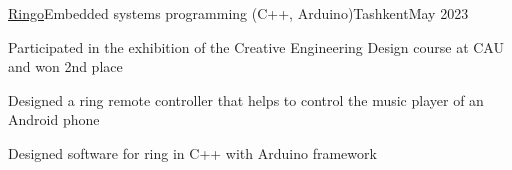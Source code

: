 \begin{resume_employer}{\href{https://drive.google.com/file/d/1yckMHFwHHNBtbgwnOTRsdhVB2KOukAbZ/view?usp=sharing}{Ringo}}{Embedded systems programming (C++, Arduino)}{Tashkent}{May 2023}
        \item Participated in the exhibition of the Creative Engineering Design course at CAU and won 2nd place
        \item Designed a ring remote controller that helps to control the music player of an Android phone
        \item Designed software for ring in C++ with Arduino framework
\end{resume_employer}
